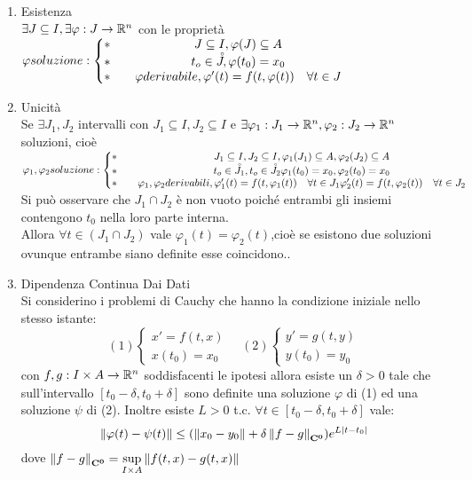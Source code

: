 \begin{enumerate}
	\item Esistenza\\
	$\exists J\subseteq I, \exists\varphi : J \to \mathbb{R}^n$ con le proprietà\\
	$\varphi soluzione:
	\left\{
	\begin{matrix}
	\ast && J\subseteq I, \varphi(J)\subseteq{A}\\
	\ast && t_o\in\accentset{\circ}{J}, \varphi(t_0)=x_0\\
	\ast && \varphi derivabile,  \varphi'(t)=f(t,\varphi(t)) \quad\forall t\in J\end{matrix}\right.$
	\item Unicità\\
	Se $\exists J_1,J_2$ intervalli con $J_1\subseteq I,J_2\subseteq I$ e $\exists \varphi_1:J_1\to \mathbb{R}^n, \varphi_2:J_2\to \mathbb{R}^n$ soluzioni, cioè\\
	$\varphi_1,\varphi_2 soluzione:
	\left\{
	\begin{matrix}
	\ast && J_1\subseteq I,J_2\subseteq I, \varphi_1(J_1)\subseteq{A},\varphi_2(J_2)\subseteq{A}\\
	\ast && t_o\in\accentset{\circ}{J_1},t_o\in\accentset{\circ}{J_2} \varphi_1(t_0)=x_0, \varphi_2(t_0)=x_0\\
	\ast && \varphi_1,\varphi_2 derivabili,  \varphi_1'(t)=f(t,\varphi_1(t)) \quad\forall t\in J_1
	 \varphi_2'(t)=f(t,\varphi_2(t)) \quad\forall t\in J_2
	\end{matrix}\right.$
	Si può osservare che $J_1\cap J_2$ è non vuoto poiché entrambi gli insiemi contengono $t_0$ nella loro parte interna.\\
	Allora $\forall t \in(J_1\cap J_2)$ vale $\varphi_1(t)=\varphi_2(t)$,cioè se esistono due soluzioni ovunque entrambe siano definite esse coincidono..\\
	\item Dipendenza Continua Dai Dati\\
	Si considerino i problemi di Cauchy che hanno la condizione iniziale nello stesso istante:
	$$ 
	(1)\left\{
	\begin{matrix}
	 x'=f(t,x)\\x(t_0)=x_0
	\end{matrix}
	\right.\quad
	(2)\left\{
	\begin{matrix}
	 y'=g(t,y)\\y(t_0)=y_0
	\end{matrix}
	\right.
	$$
	con $f,g:I\times A \to \mathbb{R}^n$ soddisfacenti le ipotesi allora esiste un $\delta >0$ tale che sull'intervallo $\left[ t_0-\delta,t_0+\delta \right]$ sono definite una soluzione $\varphi$ di (1) ed una soluzione $\psi$ di (2). Inoltre esiste $L>0$ t.c. $\forall t\in \left[t_0-\delta,t_0+\delta\right]$ vale:
	$$\left\|\varphi(t)-\psi(t)\right\| \le (\left\|x_0-y_0\right\|+\delta\left\|f-g\right\|_{\mathbf{C^{0}}})e^{L\left|t-t_0\right|}$$
	dove $\left\|f-g\right\|_{\mathbf{C^{0}}}=\sup\limits_{I\times A}\left\|f(t,x)-g(t,x)\right\|$
\end{enumerate}
